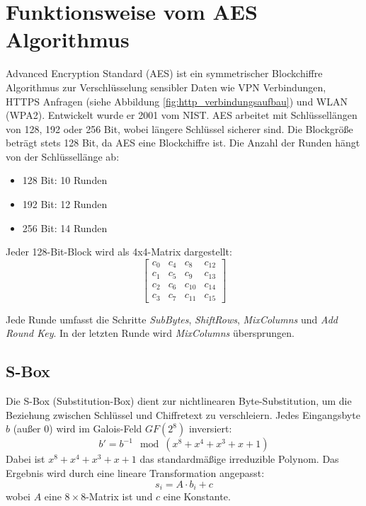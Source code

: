 \section{Funktionsweise vom AES Algorithmus}
\setlength{\parindent}{0pt}

Advanced Encryption Standard (AES) ist ein symmetrischer Blockchiffre Algorithmus zur 
Verschlüsselung sensibler Daten wie VPN Verbindungen, HTTPS Anfragen 
(siehe Abbildung \ref{fig:http_verbindungsaufbau}) und WLAN (WPA2). 
Entwickelt wurde er 2001 vom NIST. AES arbeitet mit Schlüssellängen von 128, 192 oder 256 Bit, 
wobei längere Schlüssel sicherer sind. Die Blockgröße beträgt stets 128 Bit, da AES eine Blockchiffre 
ist. Die Anzahl der Runden hängt von der Schlüssellänge ab: 
\begin{itemize}
    \item 128 Bit: 10 Runden
    \item 192 Bit: 12 Runden
    \item 256 Bit: 14 Runden
\end{itemize}

Jeder 128-Bit-Block wird als 4x4-Matrix dargestellt:
\[
\begin{bmatrix}
c_0  & c_4  & c_8  & c_{12} \\
c_1  & c_5  & c_9  & c_{13} \\
c_2  & c_6  & c_{10} & c_{14} \\
c_3  & c_7  & c_{11} & c_{15}
\end{bmatrix}
\]

Jede Runde umfasst die Schritte \textit{SubBytes}, \textit{ShiftRows}, \textit{MixColumns} und \textit{Add Round Key}. In der letzten Runde wird \textit{MixColumns} über\-sprungen.\cite{AES_Algorithmus_2}\cite{AES_Algorithmus_3}\cite{AES_Algorithmus}\cite{Blockchiffre}

\subsection{S-Box}
Die S-Box (Substitution-Box) dient zur nichtlinearen Byte-Substitution, um die Beziehung zwischen Schlüssel und Chiffretext zu verschleiern. Jedes Eingangsbyte \(b\) (außer 0) wird im Galois-Feld \(GF(2^8)\) inversiert:
\[
b' = b^{-1} \mod (x^8 + x^4 + x^3 + x + 1)
\]
Dabei ist \(x^8 + x^4 + x^3 + x + 1\) das standardmäßige irreduzible Polynom. Das Ergebnis wird durch eine lineare Transformation angepasst:
\[
s_i = A \cdot b_i + c
\]
wobei \(A\) eine $8 \times 8$-Matrix ist und \(c\) eine Konstante.\cite{Endliche_körper}\cite{S_Box}

